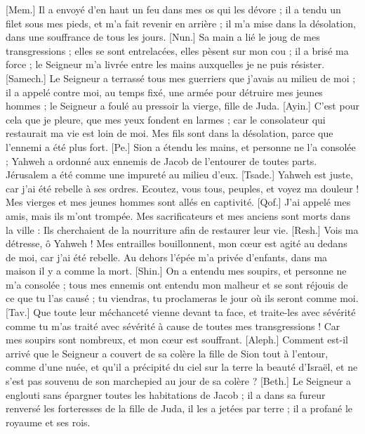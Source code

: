 \begin{multicols}{2}
[Mem.] Il a envoyé d'en haut un feu dans mes os qui les dévore ; il a tendu un filet sous mes pieds, et m'a fait revenir en arrière ; il m'a mise dans la désolation, dans une souffrance de tous les jours.
[Nun.] Sa main a lié le joug de mes transgressions ; elles se sont entrelacées, elles pèsent sur mon cou ;  il a brisé ma force ; le Seigneur m’a livrée entre les mains auxquelles je ne puis résister.
[Samech.] Le Seigneur a terrassé tous mes guerriers que j'avais au milieu de moi ; il a appelé contre moi, au temps fixé, une armée pour détruire mes jeunes hommes ; le Seigneur a foulé au pressoir la vierge, fille de Juda.
[Ayin.] C’est pour cela que je pleure, que mes yeux fondent en larmes ; car le consolateur qui restaurait ma vie est loin de moi.  Mes fils sont dans la désolation, parce que l'ennemi a été plus fort.
[Pe.] Sion a étendu les mains, et personne ne l'a consolée ; Yahweh a ordonné aux ennemis de Jacob de l’entourer de toutes parts. Jérusalem a été comme une impureté au milieu d'eux.
[Tsade.] Yahweh est juste, car j'ai été rebelle à ses ordres. Ecoutez, vous tous, peuples, et voyez ma douleur ! Mes vierges et mes jeunes hommes sont allés en captivité.
[Qof.] J'ai appelé mes amis, mais ils m'ont trompée. Mes sacrificateurs et mes anciens sont morts dans la ville : Ils cherchaient de la nourriture afin de restaurer leur vie.
[Resh.] Vois ma détresse, ô Yahweh ! Mes entrailles bouillonnent, mon cœur est agité au dedans de moi, car j'ai été rebelle. Au dehors l’épée m’a privée d’enfants, dans ma maison il y a comme la mort.
[Shin.] On a entendu mes soupirs, et personne ne m'a consolée ; tous mes ennemis ont entendu mon malheur et se sont réjouis de ce que tu l’as causé ; tu viendras, tu proclameras le jour où ils seront comme moi.
[Tav.] Que toute leur méchanceté vienne devant ta face, et traite-les avec sévérité  comme tu m'as traité avec sévérité à cause de toutes mes transgressions ! Car mes soupirs sont nombreux, et mon cœur est souffrant.
\VerseOne{}[Aleph.] Comment est-il arrivé que le Seigneur a couvert  de sa colère la fille de Sion tout à l’entour, comme d’une nuée, et qu’il a précipité du ciel sur la terre la beauté d’Israël, et ne s’est pas souvenu de son marchepied au jour de sa colère ?
[Beth.] Le Seigneur a englouti sans épargner toutes les habitations de Jacob ; il a dans sa fureur renversé les forteresses de la fille de Juda, il les a jetées par terre ; il a profané le royaume et ses rois.

\end{multicols}

